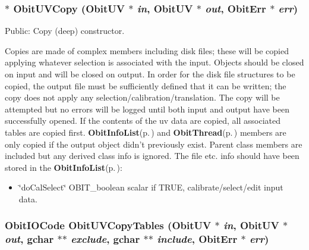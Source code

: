 \subsubsection{$\ast$ Obit\-UVCopy ({\bf Obit\-UV} $\ast$ {\em in}, {\bf Obit\-UV} $\ast$ {\em out}, {\bf Obit\-Err} $\ast$ {\em err})}\label{ObitUV_8c_a17}


Public: Copy (deep) constructor. 

Copies are made of complex members including disk files; these will be copied applying whatever selection is associated with the input. Objects should be closed on input and will be closed on output. In order for the disk file structures to be copied, the output file must be sufficiently defined that it can be written; the copy does not apply any selection/calibration/translation. The copy will be attempted but no errors will be logged until both input and output have been successfully opened. If the contents of the uv data are copied, all associated tables are copied first. {\bf Obit\-Info\-List}{\rm (p.\,\pageref{structObitInfoList})} and {\bf Obit\-Thread}{\rm (p.\,\pageref{structObitThread})} members are only copied if the output object didn't previously exist. Parent class members are included but any derived class info is ignored. The file etc. info should have been stored in the {\bf Obit\-Info\-List}{\rm (p.\,\pageref{structObitInfoList})}: \begin{itemize}
\item \char`\"{}do\-Cal\-Select\char`\"{} OBIT\_\-boolean scalar if TRUE, calibrate/select/edit input data. 
\end{itemize}
\subsubsection{\setlength{\rightskip}{0pt plus 5cm}Obit\-IOCode Obit\-UVCopy\-Tables ({\bf Obit\-UV} $\ast$ {\em in}, {\bf Obit\-UV} $\ast$ {\em out}, gchar $\ast$$\ast$ {\em exclude}, gchar $\ast$$\ast$ {\em include}, {\bf Obit\-Err} $\ast$ {\em err})}\label{ObitUV_8c_a32}


